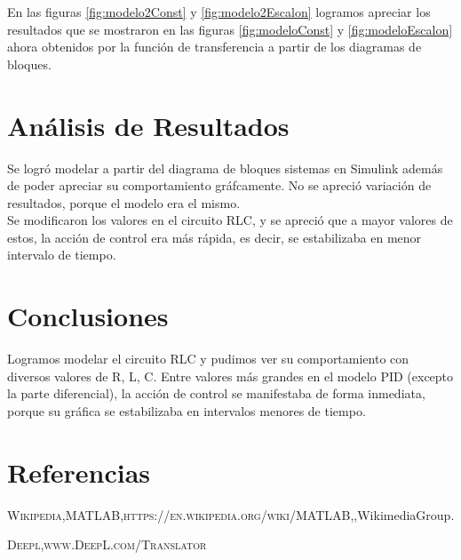 \documentclass[]{article}
\begin{document}
En las figuras \ref{fig:modelo2Const} y \ref{fig:modelo2Escalon} logramos apreciar los resultados que se mostraron en las figuras \ref{fig:modeloConst} y \ref{fig:modeloEscalon} ahora obtenidos por la función de transferencia a partir de los diagramas de bloques.\\


\section{Análisis de Resultados}

Se logró modelar a partir del diagrama de bloques sistemas en Simulink además de poder apreciar su comportamiento gráfcamente. No se apreció variación de resultados, porque el modelo era el mismo.\\

Se modificaron los valores en el circuito RLC, y se apreció que a mayor valores de estos, la acción de control era más rápida, es decir, se estabilizaba en menor intervalo de tiempo. \\

\section{Conclusiones}

Logramos modelar el circuito RLC y pudimos ver su comportamiento con diversos valores de R, L, C. Entre valores más grandes en el modelo PID (excepto la parte diferencial), la acción de control se manifestaba de forma inmediata, porque su gráfica se estabilizaba en intervalos menores de tiempo.




%
%
%
\section{Referencias}

\begin{thebibliography}{widestlabel}
	\textsc{Wikipedia},\textsc{MATLAB},\textsc{https://en.wikipedia.org/wiki/MATLAB},\textit{},WikimediaGroup.
	
   \textsc{Deepl},\textsc{www.DeepL.com/Translator}
	
	
	
\end{thebibliography}
\end{document}
